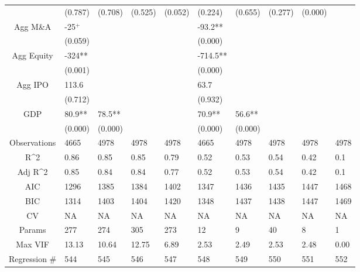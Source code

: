 \documentclass{article}
\begin{document}
\begin{table}[H]
\begin{tabular}{|clllllllll|}
   & (0.787) & (0.708) & (0.525) & (0.052) & (0.224) & (0.655) & (0.277) & (0.000) &  \\ 
  Agg M\&A & -25$^{+}$ &  &  &  & -93.2** &  &  &  &  \\ 
   & (0.059) &  &  &  & (0.000) &  &  &  &  \\ 
  Agg Equity & -324** &  &  &  & -714.5** &  &  &  &  \\ 
   & (0.001) &  &  &  & (0.000) &  &  &  &  \\ 
  Agg IPO & 113.6 &  &  &  & 63.7 &  &  &  &  \\ 
   & (0.712) &  &  &  & (0.932) &  &  &  &  \\ 
  GDP & 80.9** & 78.5** &  &  & 70.9** & 56.6** &  &  &  \\ 
   & (0.000) & (0.000) &  &  & (0.000) & (0.000) &  &  &  \\ 
  \hline 
 Observations & 4665 & 4978 & 4978 & 4978 & 4665 & 4978 & 4978 & 4978 & 4978 \\ 
  R^2 & 0.86 & 0.85 & 0.85 & 0.79 & 0.52 & 0.53 & 0.54 & 0.42 & 0.1 \\ 
  Adj R^2 & 0.85 & 0.84 & 0.84 & 0.77 & 0.52 & 0.53 & 0.54 & 0.42 & 0.1 \\ 
  AIC & 1296 & 1385 & 1384 & 1402 & 1347 & 1436 & 1435 & 1447 & 1468 \\ 
  BIC & 1314 & 1403 & 1404 & 1420 & 1348 & 1437 & 1438 & 1447 & 1469 \\ 
  CV & NA & NA & NA & NA & NA & NA & NA & NA & NA \\ 
  Params & 277 & 274 & 305 & 273 & 12 & 9 & 40 & 8 & 1 \\ 
  Max VIF & 13.13 & 10.64 & 12.75 & 6.89 & 2.53 & 2.49 & 2.53 & 2.48 & 0.00 \\ 
  Regression \# & 544 & 545 & 546 & 547 & 548 & 549 & 550 & 551 & 552 \\ 
   \hline
\end{tabular}
 
\end{table}
\end{document}
